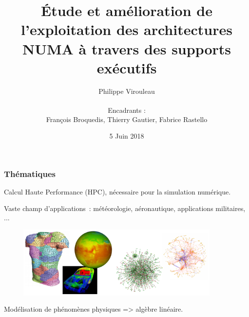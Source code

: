 \documentclass[xcolor={usenames,dvipsnames,svgnames,table}, aspectratio=43]{beamer}
\title[Soutenance de thèse]{Étude et amélioration de l'exploitation des architectures NUMA à travers des supports exécutifs
  \vspace{-25pt}
}
\author[Philippe Virouleau]{
Philippe Virouleau\\
  ~\\
\small Encadrants :\\
François Broquedis, Thierry Gautier, Fabrice Rastello}
\institute[CORSE/AVALON]{Inria - CORSE/AVALON teams}
\date{5 Juin 2018}
\begin{document}








\mymaketitle

\begin{frame}
\frametitle{Thématiques}

  Calcul Haute Performance (HPC), nécessaire pour la simulation numérique.

  Vaste champ d'applications~: météorologie, aéronautique, applications militaires, ...

  \begin{figure}
    \includegraphics[width=0.9\textwidth]{graph/simulation.pdf}
  \end{figure}


  Modélisation de phénomènes physiques => algèbre linéaire.
\end{frame}
\end{document}
